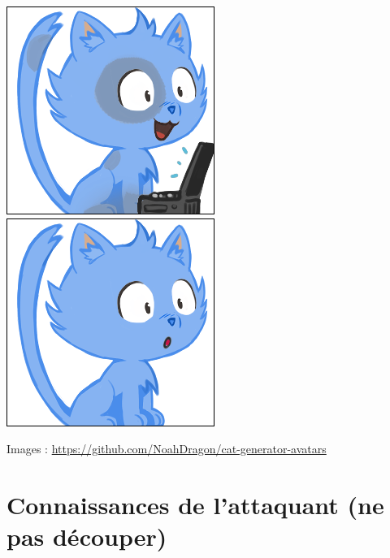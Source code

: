 \documentclass[a4paper, 12pt]{article}
\begin{document}
  \includegraphics[scale=0.45]{out/69.png}
  \includegraphics[scale=0.45]{out/18.png}

  Images : \url{https://github.com/NoahDragon/cat-generator-avatars}

  \section*{Connaissances de l'attaquant (ne pas découper)}
\end{document}
